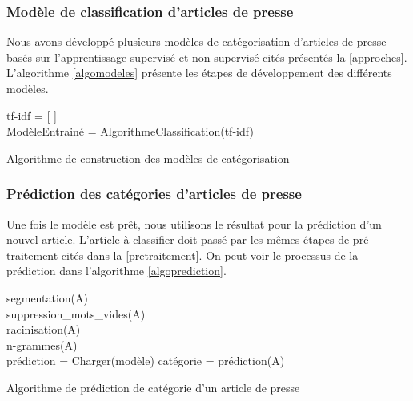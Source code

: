         \subsubsection{Modèle de classification d'articles de presse}
            Nous avons développé plusieurs modèles de catégorisation d'articles de presse basés sur l'apprentissage supervisé et non supervisé cités présentés la \autoref{approches}. L'algorithme \autoref{algomodeles} présente les étapes de développement des différents modèles.

            \begin{algorithm2e}[H]
            \label{algomodeles}
            \SetAlgoLined
            tf-idf = [ ]\\
            ModèleEntrainé = AlgorithmeClassification(tf-idf)\\
            \caption{Algorithme de construction des modèles de catégorisation}
            \end{algorithm2e}

        \subsubsection{Prédiction des catégories d'articles de presse}
            Une fois le modèle est prêt, nous utilisons le résultat pour la prédiction d'un nouvel article. L'article à classifier doit passé par les mêmes étapes de pré-traitement cités dans la \autoref{pretraitement}. On peut voir le processus de la prédiction dans l'algorithme \autoref{algoprediction}.

            \begin{algorithm2e}[H]
            \label{algoprediction}
            \SetAlgoLined
            segmentation(A)\\
            suppression\_mots\_vides(A)\\
            racinisation(A)\\
            n-grammes(A)\\
            prédiction = Charger(modèle)
            catégorie = prédiction(A)
            \caption{Algorithme de prédiction de catégorie d'un article de presse}
            \end{algorithm2e}

